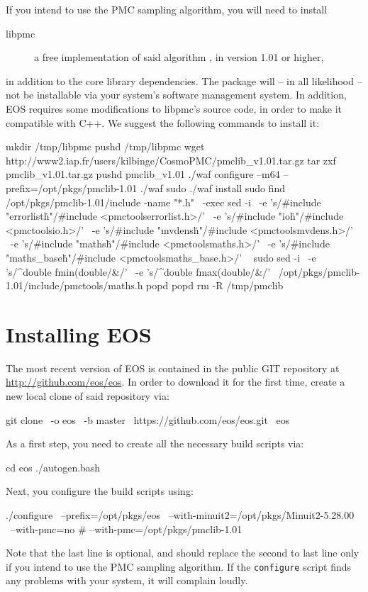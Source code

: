 If you intend to use the \gls{PMC} sampling algorithm, you will need to install
\begin{description}
    \item[libpmc] a free implementation of said algorithm \cite{libpmc}, in version 1.01 or higher,
\end{description}
in addition to the core library dependencies. The  package will -- in all likelihood -- not
be installable via your system's software management system. In addition, EOS requires some
modifications to libpmc's source code, in order to make it compatible with C++. We suggest
the following commands to install it:
\begin{commandline}
mkdir /tmp/libpmc
pushd /tmp/libpmc
wget http://www2.iap.fr/users/kilbinge/CosmoPMC/pmclib_v1.01.tar.gz
tar zxf pmclib_v1.01.tar.gz
pushd pmclib_v1.01
./waf configure --m64 --prefix=/opt/pkgs/pmclib-1.01
./waf
sudo ./waf install
sudo find /opt/pkgs/pmclib-1.01/include -name "*.h" \
    -exec sed -i \
    -e 's/#include "errorlist\.h"/#include <pmctools\/errorlist.h>/' \
    -e 's/#include "io\.h"/#include <pmctools\/io.h>/' \
    -e 's/#include "mvdens\.h"/#include <pmctools\/mvdens.h>/' \
    -e 's/#include "maths\.h"/#include <pmctools\/maths.h>/' \
    -e 's/#include "maths_base\.h"/#include <pmctools\/maths_base.h>/' \
    {} \;
sudo sed -i \
    -e 's/^double fmin(double/\/\/&/' \
    -e 's/^double fmax(double/\/\/&/' \
    /opt/pkgs/pmclib-1.01/include/pmctools/maths.h
popd
popd
rm -R /tmp/pmclib
\end{commandline}

\section{Installing EOS}

The most recent version of EOS is contained in the public GIT \cite{GIT}
repository at \url{http://github.com/eos/eos}.  In order to download it for the
first time, create a new local clone of said repository via:
%
\begin{commandline}
git clone \
    -o eos \
    -b master \
    https://github.com/eos/eos.git \
    eos
\end{commandline}


As a first step, you need to create all the necessary build scripts via:
%
\begin{commandline}
cd eos
./autogen.bash
\end{commandline}
%
Next, you configure the build scripts using:
%
\begin{commandline}
./configure \
    --prefix=/opt/pkgs/eos \
    --with-minuit2=/opt/pkgs/Minuit2-5.28.00 \
    --with-pmc=no
    # --with-pmc=/opt/pkgs/pmclib-1.01
\end{commandline}
%
Note that the last line is optional, and should replace the second to last line only
if you intend to use the \gls{PMC} sampling algorithm. If the \texttt{configure} script
finds any problems with your system, it will complain loudly.\\

